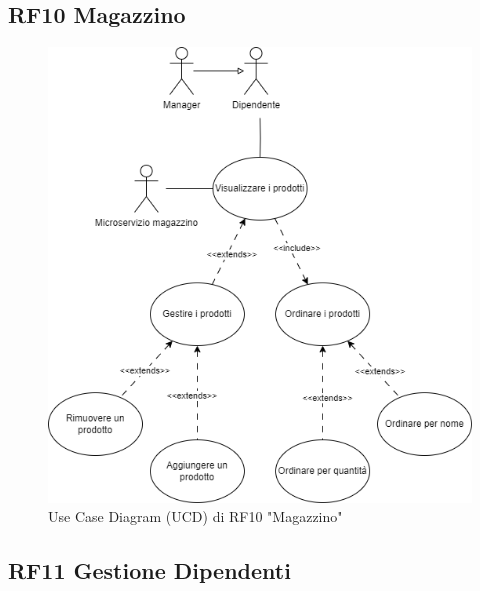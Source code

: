 \documentclass{report}
\begin{document}
\subsection*{RF10 Magazzino}
\begin{figure}[H]
	\centering\includegraphics[width=1\textwidth]{images/UCD/RF10_magazzino_UCD.png}
	Use Case Diagram (UCD) di RF10 "Magazzino"
\end{figure}

\subsection*{RF11 Gestione Dipendenti}
\end{document}
